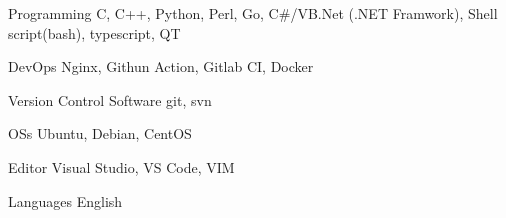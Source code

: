 
\begin{cvskills}

  \cvskill
    {Programming} %
    {C, C++, Python, Perl, Go, C\#/VB.Net (.NET Framwork), Shell script(bash), typescript, QT} %

  \cvskill
    {DevOps} %
    {Nginx, Githun Action, Gitlab CI, Docker} %

  \cvskill
    {Version Control Software} %
    {git, svn} %

  \cvskill
    {OSs} %
    {Ubuntu, Debian, CentOS} %

  \cvskill
    {Editor} %
    {Visual Studio, VS Code, VIM} %

  \cvskill
    {Languages} %
    {English} %

\end{cvskills}
